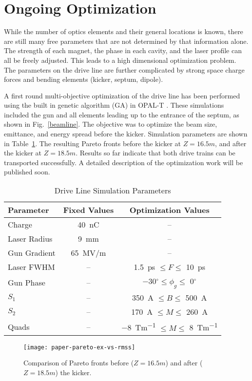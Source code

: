 \documentclass[letterpaper,  %
              ]{jacow-2_3}   %
\begin{document}
\section{Ongoing Optimization}
While the number of optics elements and their 
general locations is known, there are still many free parameters that 
are not determined by that information alone. 
The strength of each magnet, the phase in each cavity, 
and the laser profile can all be freely adjusted.
This leads to a high dimensional optimization problem. 
The parameters on the drive line are further complicated
by strong space charge forces and bending elements (kicker, septum, dipole).

A first round multi-objective optimization of the drive line has been performed 
using the built in genetic algorithm (GA) in OPAL-T \cite{opal}. 
These simulations included the gun and all elements leading up 
to the entrance of the septum, as shown in Fig.~\ref{beamline}.
The objective was to optimize the beam size, emittance, and energy spread before the kicker.
Simulation parameters are shown in Table~\ref{simparam}.
The resulting Pareto fronts before the kicker at $Z=16.5m$, and after the 
kicker at $Z=18.5m$. Results so far indicate that both drive trains can be transported successfully.
A detailed description of the optimization work will be published soon.
\begin{table}[hbt]
	\centering
	\caption{Drive Line Simulation Parameters}
	\begin{tabular}{lcc}
		\toprule
		\textbf{Parameter} & \textbf{Fixed Values}  & \textbf{Optimization Values} \\
		\midrule
		Charge       & \SI{40}{nC}       & --   \\ %
		Laser Radius & \SI{9}{mm}        & --    \\
		Gun Gradient & \SI{65}{MV/m}     & --  \\ %
		Laser FWHM   & --      			 & \SI{1.5}{ps} $\leq F \leq $ \SI{10}{ps}	  \\ %
		Gun Phase    & -- 				 & \SI{-30}{}$^{\circ} \leq \phi_g \leq$ \SI{0}{}$^{\circ}$  \\	
		$S_1$        & --		 		 & \SI{350}{A} $\leq B \leq $ \SI{500}{A}	  \\
		$S_2$		 & --  	 			 & \SI{170}{A} $\leq M \leq $ \SI{260}{A}	  \\
		Quads 		 & --				 & \SI{-8}{Tm^{-1}} $\leq M \leq $ \SI{8}{Tm^{-1}}	  \\
		\bottomrule
	\end{tabular}
	\label{simparam}
\end{table}
\begin{figure}
	\texttt{[image: paper-pareto-ex-vs-rmss]}
	\caption{Comparison of Pareto fronts before ($Z=16.5m$) and after ($Z=18.5m$) the kicker. }
	\label{initial}
\end{figure}
\end{document}
